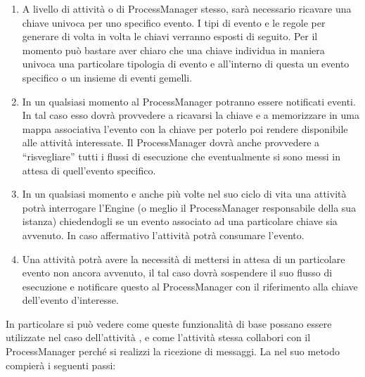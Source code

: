 \begin{enumerate}
  \item A livello di attività o di ProcessManager stesso,
  sarà necessario ricavare una chiave univoca per uno specifico 
  evento. I tipi di evento e le regole per generare di volta in
  volta le chiavi verranno esposti di seguito. Per il momento può bastare aver
  chiaro che una chiave individua in maniera univoca una particolare tipologia di evento e all'interno di questa un evento specifico o un insieme
  di eventi gemelli.
  
  \item In un qualsiasi momento al ProcessManager potranno essere notificati
  eventi. In tal caso esso dovrà provvedere a ricavarsi la chiave e a
  memorizzare in uma mappa associativa l'evento con la chiave per poterlo poi
  rendere disponibile alle attività interessate. Il ProcessManager dovrà anche
  provvedere a ``risvegliare'' tutti i flussi di esecuzione che
  eventualmente si sono messi in attesa di quell'evento specifico.
   
  \item In un qualsiasi momento e anche più volte nel suo ciclo di vita una
  attività potrà interrogare l'Engine (o meglio il ProcessManager responsabile
  della sua istanza) chiedendogli se un evento associato ad una particolare
  chiave sia avvenuto. In caso affermativo l'attività potrà consumare l'evento.

  \item Una attività potrà avere la necessità di mettersi in attesa di un
  particolare evento non ancora avvenuto, il tal caso dovrà sospendere il
  suo flusso di esecuzione e notificare questo al ProcessManager
  con il riferimento alla chiave dell'evento d'interesse. 
\end{enumerate}


In particolare si può vedere come queste funzionalità di base possano essere
utilizzate nel caso dell'attività , e come
l'attività stessa collabori con il ProcessManager perché si realizzi la
ricezione di messaggi. La  nel suo metodo
 compierà i seguenti passi:

